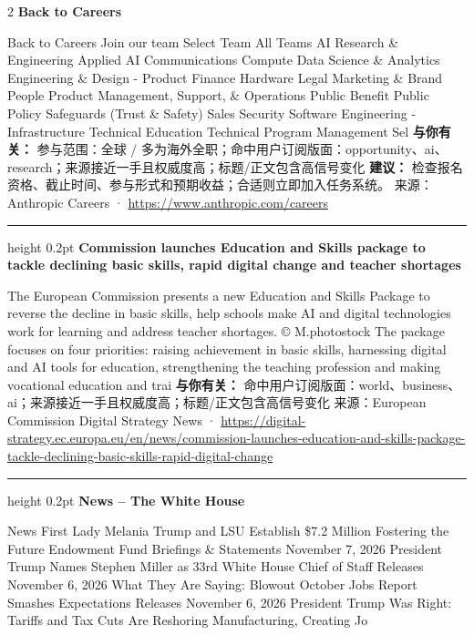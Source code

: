 \documentclass[10.5pt]{ctexart}
\begin{document}
\begin{multicols}{2}
{\large\bfseries Back to Careers}\par
Back to Careers Join our team Select Team All Teams AI Research \& Engineering Applied AI Communications Compute Data Science \& Analytics Engineering \& Design - Product Finance Hardware Legal Marketing \& Brand People Product Management, Support, \& Operations Public Benefit Public Policy Safeguards (Trust \& Safety) Sales Security Software Engineering - Infrastructure Technical Education Technical Program Management Sel
\textbf{与你有关：} 参与范围：全球 / 多为海外全职；命中用户订阅版面：opportunity、ai、research；来源接近一手且权威度高；标题/正文包含高信号变化
\textbf{建议：} 检查报名资格、截止时间、参与形式和预期收益；合适则立即加入任务系统。
{\footnotesize\color{ormuted} 来源：Anthropic Careers · \url{https://www.anthropic.com/careers}}
\vspace{2mm}
\hrule height 0.2pt
\vspace{2mm}
{\large\bfseries Commission launches Education and Skills package to tackle declining basic skills, rapid digital change and teacher shortages}\par
The European Commission presents a new Education and Skills Package to reverse the decline in basic skills, help schools make AI and digital technologies work for learning and address teacher shortages. © M.photostock The package focuses on four priorities: raising achievement in basic skills, harnessing digital and AI tools for education, strengthening the teaching profession and making vocational education and trai
\textbf{与你有关：} 命中用户订阅版面：world、business、ai；来源接近一手且权威度高；标题/正文包含高信号变化
{\footnotesize\color{ormuted} 来源：European Commission Digital Strategy News · \url{https://digital-strategy.ec.europa.eu/en/news/commission-launches-education-and-skills-package-tackle-declining-basic-skills-rapid-digital-change}}
\vspace{2mm}
\hrule height 0.2pt
\vspace{2mm}
{\large\bfseries News – The White House}\par
News First Lady Melania Trump and LSU Establish \$7.2 Million Fostering the Future Endowment Fund Briefings \& Statements November 7, 2026 President Trump Names Stephen Miller as 33rd White House Chief of Staff Releases November 6, 2026 What They Are Saying: Blowout October Jobs Report Smashes Expectations Releases November 6, 2026 President Trump Was Right: Tariffs and Tax Cuts Are Reshoring Manufacturing, Creating Jo

\end{multicols}
\end{document}
